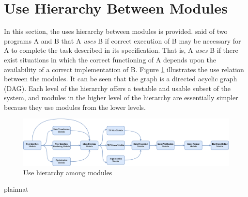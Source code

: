 \documentclass[12pt, titlepage]{article}
\begin{document}
\section{Use Hierarchy Between Modules} \label{SecUse}

In this section, the uses hierarchy between modules is
provided. \citet{Parnas1978} said of two programs A and B that A {\em uses} B if
correct execution of B may be necessary for A to complete the task described in
its specification. That is, A {\em uses} B if there exist situations in which
the correct functioning of A depends upon the availability of a correct
implementation of B.  Figure \ref{FigUH} illustrates the use relation between
the modules. It can be seen that the graph is a directed acyclic graph
(DAG). Each level of the hierarchy offers a testable and usable subset of the
system, and modules in the higher level of the hierarchy are essentially simpler
because they use modules from the lower levels.

\begin{figure}[H]
  \centering
  \includegraphics[width=\textwidth]{ModuleHier-Final.png}
  \caption{Use hierarchy among modules}
  \label{FigUH}
\end{figure}









\newpage
 {plainnat}


\newpage{}
\end{document}
